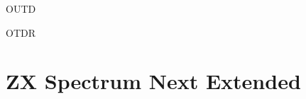 \documentclass[12pt,twoside,openright,a4paper]{book}
\begin{document}
\begin{minipage}{\textwidth}
\begin{instrtable}
	\begin{instruction}{OUTD} 
		\Symbol{\SymOUTD[0]}
			\FlagsOUTI
		\SkipToSymbol
			\Symbol{\SymOUTD[1]}
			\FromSymbolToOpCode
		\SkipToSymbol
			\Symbol{\SymOUTD[2]}
	\end{instruction}

	\begin{lastinstruction}{OTDR} 
		\Symbol{\SymOTDR[0]}
			\FlagsOTDR
		\SkipToSymbol
			\Symbol{\SymOTDR[1]}
			\FromSymbolToOpCode
	\end{lastinstruction}

\end{instrtable}

\begin{notestable}
\end{notestable}
	
\end{minipage}



\pagebreak
\section{ZX Spectrum Next Extended}
\label{zx_next_instructions_table}
\end{document}

